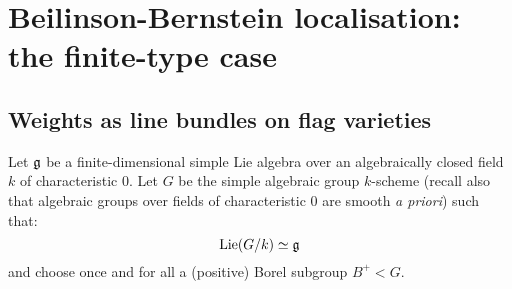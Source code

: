 \section{Beilinson-Bernstein localisation: the finite-type case}
    \subsection{Weights as line bundles on flag varieties}
        Let $\mathfrak{g}$ be a finite-dimensional simple Lie algebra over an algebraically closed field $k$ of characteristic $0$. Let $G$ be the simple algebraic group $k$-scheme (recall also that algebraic groups over fields of characteristic $0$ are smooth \textit{a priori}) such that:
            $$\mathrm{Lie}(G/k) \simeq \mathfrak{g}$$
        and choose once and for all a (positive) Borel subgroup $B^+ < G$.


